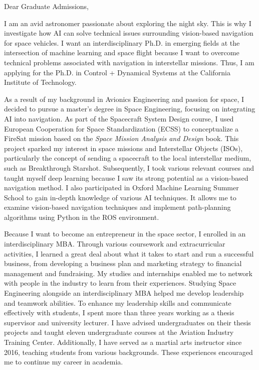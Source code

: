 \documentclass[a4,25pt]{article}
\begin{document}
\begin{large} 
Dear Graduate Admissions, \par
\vspace{-0.25cm} \quad 
I am an avid astronomer passionate about exploring the night sky. This is why I investigate how AI can solve technical issues surrounding vision-based navigation for space vehicles. I want an interdisciplinary Ph.D. in emerging fields at the intersection of machine learning and space flight because I want to overcome technical problems associated with navigation in interstellar missions. Thus, I am applying for the Ph.D. in Control + Dynamical Systems at the California Institute of Technology. \par
\vspace{-0.25cm}\quad As a result of my background in Avionics Engineering and passion for space, I decided to pursue a master's degree in Space Engineering, focusing on integrating AI into navigation. As part of the Spacecraft System Design course, I used European Cooperation for Space Standardization (ECSS) to conceptualize a FireSat mission based on the \textit{Space Mission Analysis and Design} book. This project sparked my interest in space missions and Interstellar Objects (ISOs), particularly the concept of sending a spacecraft to the local interstellar medium, such as Breakthrough Starshot. Subsequently, I took various relevant courses and taught myself deep learning because I saw its strong potential as a vision-based navigation method. I also participated in Oxford Machine Learning Summer School to gain in-depth knowledge of various AI techniques. It allows me to examine vision-based navigation techniques and implement path-planning algorithms using Python in the ROS environment. \par
\vspace{-0.25cm}\quad Because I want to become an entrepreneur in the space sector, I enrolled in an interdisciplinary MBA. Through various coursework and extracurricular activities, I learned a great deal about what it takes to start and run a successful business, from developing a business plan and marketing strategy to financial management and fundraising. My studies and internships enabled me to network with people in the industry to learn from their experiences. Studying Space Engineering alongside an interdisciplinary MBA helped me develop leadership and teamwork abilities. To enhance my leadership skills and communicate effectively with students, I spent more than three years working as a thesis supervisor and university lecturer. I have advised undergraduates on their thesis projects and taught eleven undergraduate courses at the Aviation Industry Training Center. Additionally, I have served as a martial arts instructor since 2016, teaching students from various backgrounds. These experiences encouraged me to continue my career in academia. \par

\end{large}
\end{document}
